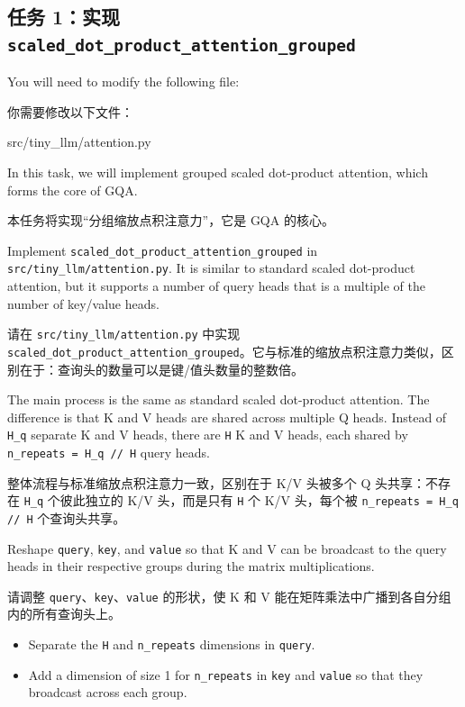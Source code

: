 \documentclass[11pt,a4paper]{article}
\newenvironment{zhpar}{%
  \par\smallskip\begingroup\color{zhcolor}\small\ignorespaces%
}{\endgroup\par\smallskip}
\begin{document}
\subsection*{任务 1：实现 \texttt{scaled\_dot\_product\_attention\_grouped}}

You will need to modify the following file:

\begin{zhpar}
你需要修改以下文件：
\end{zhpar}
\begin{codeblock}
src/tiny_llm/attention.py
\end{codeblock}

In this task, we will implement grouped scaled dot-product attention, which forms the core of GQA.

\begin{zhpar}
本任务将实现“分组缩放点积注意力”，它是 GQA 的核心。
\end{zhpar}
Implement \texttt{scaled\_dot\_product\_attention\_grouped} in \texttt{src/tiny\_llm/attention.py}. It is similar to standard scaled dot-product attention, but it supports a number of query heads that is a multiple of the number of key/value heads.

\begin{zhpar}
请在 \texttt{src/tiny\_llm/attention.py} 中实现 \texttt{scaled\_dot\_product\_attention\_grouped}。它与标准的缩放点积注意力类似，区别在于：查询头的数量可以是键/值头数量的整数倍。
\end{zhpar}
The main process is the same as standard scaled dot-product attention. The difference is that K and V heads are shared across multiple Q heads. Instead of \texttt{H\_q} separate K and V heads, there are \texttt{H} K and V heads, each shared by \texttt{n\_repeats = H\_q // H} query heads.

\begin{zhpar}
整体流程与标准缩放点积注意力一致，区别在于 K/V 头被多个 Q 头共享：不存在 \texttt{H\_q} 个彼此独立的 K/V 头，而是只有 \texttt{H} 个 K/V 头，每个被 \texttt{n\_repeats = H\_q // H} 个查询头共享。
\end{zhpar}
Reshape \texttt{query}, \texttt{key}, and \texttt{value} so that K and V can be broadcast to the query heads in their respective groups during the matrix multiplications.

\begin{zhpar}
请调整 \texttt{query}、\texttt{key}、\texttt{value} 的形状，使 K 和 V 能在矩阵乘法中广播到各自分组内的所有查询头上。
\end{zhpar}
\begin{itemize}[leftmargin=1.6em,itemsep=0.15em,parsep=0pt]
\item Separate the \texttt{H} and \texttt{n\_repeats} dimensions in \texttt{query}.
\item Add a dimension of size 1 for \texttt{n\_repeats} in \texttt{key} and \texttt{value} so that they broadcast across each group.
\end{itemize}
\end{document}

